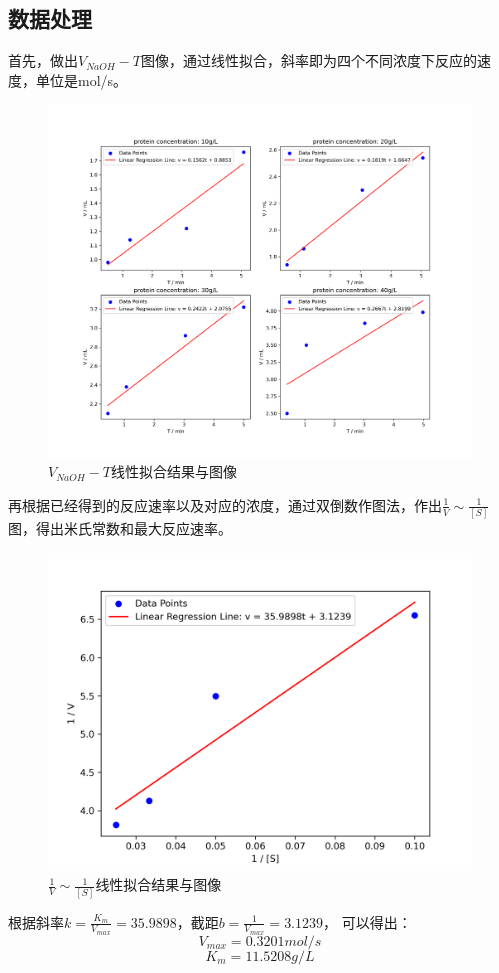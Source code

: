 \documentclass[UTF8]{ctexart}
\begin{document}
        \subsection{数据处理}
        首先，做出$V_{NaOH} - T$图像，通过线性拟合，斜率即为四个不同浓度下反应的速度，单位是mol/s。
        \begin{figure}[H]
             \centering
             \includegraphics[width=1\linewidth]{out1.png}
             \caption{$V_{NaOH} - T$线性拟合结果与图像}
             \label{fig:enter-label}
         \end{figure}
    \newpage
        再根据已经得到的反应速率以及对应的浓度，通过双倒数作图法，作出$\frac{1}{V} \sim \frac{1}{[S]}$图，得出米氏常数和最大反应速率。
        \begin{figure}[H]
            \centering
            \includegraphics[width=0.5\linewidth]{out2.png}
            \caption{$\frac{1}{V} \sim \frac{1}{[S]}$线性拟合结果与图像}
            \label{fig:enter-label}
        \end{figure}
        根据斜率$k = \frac{K_m}{V_{max}} = 35.9898$，截距$b = \frac{1}{V_{max}} = 3.1239$， 可以得出：
        \[V_{max} = 0.3201mol/s\]
        \[K_m = 11.5208g/L\]
\end{document}
